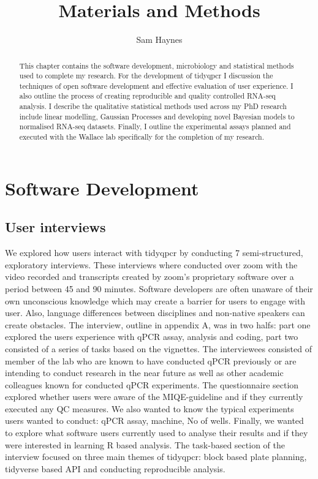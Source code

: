 \documentclass{SBCbookchapter}
\author{Sam Haynes}
\title{Materials and Methods}
\begin{document}
\maketitle

\begin{abstract}
This chapter contains the software development, microbiology and statistical methods used to complete my research. For the development of tidyqpcr I discussion the techniques of open software development and effective evaluation of user experience. I also outline the process of creating reproducible and quality controlled RNA-seq analysis. I describe the qualitative statistical methods used across my PhD research include linear modelling, Gaussian Processes and developing novel Bayesian models to normalised RNA-seq datasets. Finally, I outline the experimental assays planned and executed with the Wallace lab specifically for the completion of my research. 

\end{abstract}

\section{Software Development}

\subsection{User interviews}
We explored how users interact with tidyqpcr by conducting 7 semi-structured, exploratory interviews. These interviews where conducted over zoom with the video recorded and transcripts created by zoom's proprietary software over a period between 45 and 90 minutes. Software developers are often unaware of their own unconscious knowledge which may create a barrier for users to engage with user. Also, language differences between disciplines and non-native speakers can create obstacles.  The interview, outline in appendix A, was in two halfs: part one explored the users experience with qPCR assay, analysis and coding, part two consisted of a series of tasks based on the vignettes. The interviewees consisted of member of the lab who are known to have conducted qPCR previously or are intending to conduct research in the near future as well as other academic colleagues known for conducted qPCR experiments. The questionnaire section explored whether users were aware of the MIQE-guideline and if they currently executed any QC measures. We also wanted to know the typical experiments users wanted to conduct: qPCR assay, machine, No of wells. Finally, we wanted to explore what software users currently used to analyse their results and if they were interested in learning R based analysis. The task-based section of the interview focused on three main themes of tidyqpcr: block based plate planning, tidyverse based API and conducting reproducible analysis.
\end{document}

